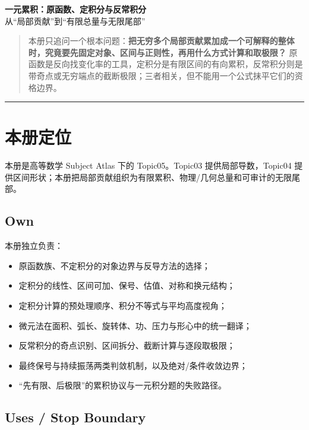 \documentclass[11pt,a4paper,fontset=fandol]{ctexart}
\begin{document}
\begin{center}
{\LARGE\textbf{一元累积：原函数、定积分与反常积分}}\\[0.4em]
{\large 从“局部贡献”到“有限总量与无限尾部”}
\end{center}
\vspace{0.5em}

\begin{quote}
本册只追问一个根本问题：\textbf{把无穷多个局部贡献累加成一个可解释的整体时，究竟要先固定对象、区间与正则性，再用什么方式计算和取极限？} 原函数是反向找变化率的工具，定积分是有限区间的有向累积，反常积分则是带奇点或无穷端点的截断极限；三者相关，但不能用一个公式抹平它们的资格边界。
\end{quote}

\begin{center}\rule{0.5\linewidth}{0.5pt}\end{center}

\setcounter{section}{-1}
\section{本册定位}

本册是高等数学 Subject Atlas 下的 Topic05。Topic03 提供局部导数，Topic04 提供区间形状；本册把局部贡献组织为有限累积、物理/几何总量和可审计的无限尾部。

\subsection{Own}

本册独立负责：
\begin{itemize}
  \item 原函数族、不定积分的对象边界与反导方法的选择；
  \item 定积分的线性、区间可加、保号、估值、对称和换元结构；
  \item 定积分计算的预处理顺序、积分不等式与平均高度视角；
  \item 微元法在面积、弧长、旋转体、功、压力与形心中的统一翻译；
  \item 反常积分的奇点识别、区间拆分、截断计算与逐段取极限；
  \item 最终保号与持续振荡两类判敛机制，以及绝对/条件收敛边界；
  \item “先有限、后极限”的累积协议与一元积分题的失败路径。
\end{itemize}

\subsection{Uses / Stop Boundary}
\end{document}
